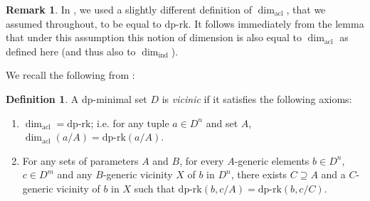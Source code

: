 \documentclass[11pt]{amsart}
\DeclareMathOperator{\acl}{acl}
\theoremstyle{definition}
\newtheorem{definition}[theorem]{Definition}
\newtheorem{remark}[theorem]{Remark}
\newcommand{\CM}{{\mathcal M}}
\newcommand{\0}{\emptyset}
\def\dpr{\mathrm{dp\text{-}rk}}
\def\sub{\subseteq}
\begin{document}
\begin{remark}

In \cite{HaHaPeGps}, we used a slightly different definition of $\dim_{\acl}$, that we assumed throughout, to be equal to $\dpr$. It follows immediately from the lemma  that under this  assumption this notion of dimension is also equal to $\dim_{\acl}$ as defined here (and thus also to $\dim_{\mathrm{ind}}$).
\end{remark}





    
    


We recall the following from \cite{HaHaPeGps}:

\begin{definition}
    A dp-minimal set $D$ is \emph{vicinic} if it satisfies the following axioms: 
\begin{enumerate}
    \item[(A1)] $\dim_{\acl}=\dpr$; i.e. for any tuple $a\in D^n$ and set $A$, $\dim_{\acl}(a/A)=\dpr(a/A)$.
    \item[(A2)] For any sets of parameters  $A$ and $B$,  for every $A$-generic elements $b\in D^n$, $c\in D^m$ and  any $B$-generic vicinity $X$  of $b$ in $D^n$,  there exists $C\supseteq A$ and a $C$-generic vicinity of $b$ in $X$ such that $\dpr(b,c/A)=\dpr(b,c/C)$.
\end{enumerate}
\end{definition}
\end{document}
